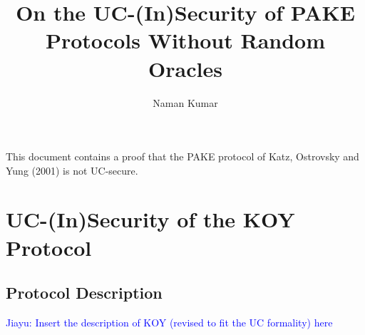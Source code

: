 \documentclass[12pt,a4paper]{article}
\title{\textbf{On the UC-(In)Security of PAKE Protocols Without Random Oracles}}
\author{Naman Kumar}
\def\xjy#1{\textcolor{blue}{Jiayu: #1}}
\begin{document}
	\maketitle
	
	This document contains a proof that the PAKE protocol of Katz, Ostrovsky and Yung (2001) is not UC-secure.

\section{UC-(In)Security of the KOY Protocol}
\subsection{Protocol Description}
\xjy{Insert the description of KOY (revised to fit the UC formality) here}
\end{document}

